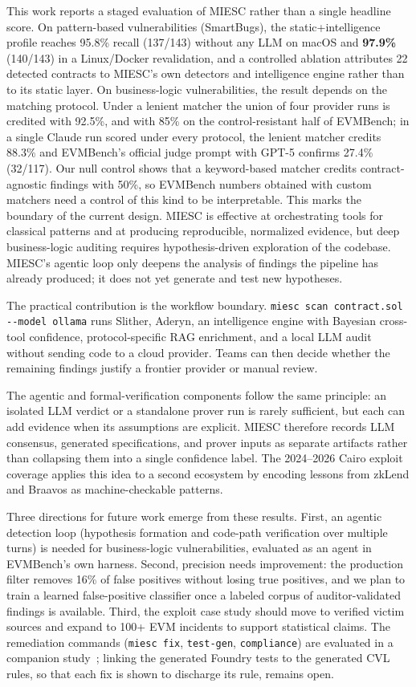\documentclass[conference]{IEEEtran}
\begin{document}
This work reports a staged evaluation of MIESC rather than a single headline score. On pattern-based vulnerabilities (SmartBugs), the static+intelligence profile reaches 95.8\% recall (137/143) without any LLM on macOS and \textbf{97.9\%} (140/143) in a Linux/Docker revalidation, and a controlled ablation attributes 22 detected contracts to MIESC's own detectors and intelligence engine rather than to its static layer. On business-logic vulnerabilities, the result depends on the matching protocol. Under a lenient matcher the union of four provider runs is credited with 92.5\%, and with 85\% on the control-resistant half of EVMBench; in a single Claude run scored under every protocol, the lenient matcher credits 88.3\% and EVMBench's official judge prompt with GPT-5 confirms 27.4\% (32/117). Our null control shows that a keyword-based matcher credits contract-agnostic findings with 50\%, so EVMBench numbers obtained with custom matchers need a control of this kind to be interpretable. This marks the boundary of the current design. MIESC is effective at orchestrating tools for classical patterns and at producing reproducible, normalized evidence, but deep business-logic auditing requires hypothesis-driven exploration of the codebase. MIESC's agentic loop only deepens the analysis of findings the pipeline has already produced; it does not yet generate and test new hypotheses.

The practical contribution is the workflow boundary. \texttt{miesc scan contract.sol -{}-model ollama} runs Slither, Aderyn, an intelligence engine with Bayesian cross-tool confidence, protocol-specific RAG enrichment, and a local LLM audit without sending code to a cloud provider. Teams can then decide whether the remaining findings justify a frontier provider or manual review.

The agentic and formal-verification components follow the same principle: an isolated LLM verdict or a standalone prover run is rarely sufficient, but each can add evidence when its assumptions are explicit. MIESC therefore records LLM consensus, generated specifications, and prover inputs as separate artifacts rather than collapsing them into a single confidence label. The 2024--2026 Cairo exploit coverage applies this idea to a second ecosystem by encoding lessons from zkLend and Braavos as machine-checkable patterns.

Three directions for future work emerge from these results. First, an agentic detection loop (hypothesis formation and code-path verification over multiple turns) is needed for business-logic vulnerabilities, evaluated as an agent in EVMBench's own harness. Second, precision needs improvement: the production filter removes 16\% of false positives without losing true positives, and we plan to train a learned false-positive classifier once a labeled corpus of auditor-validated findings is available. Third, the exploit case study should move to verified victim sources and expand to 100+ EVM incidents to support statistical claims. The remediation commands (\texttt{miesc fix}, \texttt{test-gen}, \texttt{compliance}) are evaluated in a companion study~\cite{boiero2026remediation}; linking the generated Foundry tests to the generated CVL rules, so that each fix is shown to discharge its rule, remains open.
\end{document}
